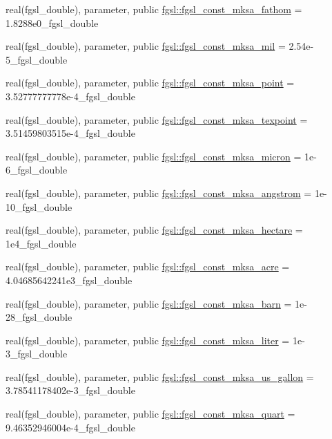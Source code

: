 \begin{DoxyCompactItemize}
real(fgsl\+\_\+double), parameter, public \hyperlink{namespacefgsl_a1b3e809c97882aeaebf2e325079f38a3}{fgsl\+::fgsl\+\_\+const\+\_\+mksa\+\_\+fathom} = 1.\+8288e0\+\_\+fgsl\+\_\+double
\item 
real(fgsl\+\_\+double), parameter, public \hyperlink{namespacefgsl_af6a9d8baf161c3f9b2b9c8ef41833a67}{fgsl\+::fgsl\+\_\+const\+\_\+mksa\+\_\+mil} = 2.\+54e-\/5\+\_\+fgsl\+\_\+double
\item 
real(fgsl\+\_\+double), parameter, public \hyperlink{namespacefgsl_ad8f1c0644b869b25114ce66526bd4a9d}{fgsl\+::fgsl\+\_\+const\+\_\+mksa\+\_\+point} = 3.\+52777777778e-\/4\+\_\+fgsl\+\_\+double
\item 
real(fgsl\+\_\+double), parameter, public \hyperlink{namespacefgsl_a962d8da1f8bc62c2323777660898e316}{fgsl\+::fgsl\+\_\+const\+\_\+mksa\+\_\+texpoint} = 3.\+51459803515e-\/4\+\_\+fgsl\+\_\+double
\item 
real(fgsl\+\_\+double), parameter, public \hyperlink{namespacefgsl_ab0be2229dca10e5128f21a8729ff742b}{fgsl\+::fgsl\+\_\+const\+\_\+mksa\+\_\+micron} = 1e-\/6\+\_\+fgsl\+\_\+double
\item 
real(fgsl\+\_\+double), parameter, public \hyperlink{namespacefgsl_ae348f6545928612e5e56ed4174d31875}{fgsl\+::fgsl\+\_\+const\+\_\+mksa\+\_\+angstrom} = 1e-\/10\+\_\+fgsl\+\_\+double
\item 
real(fgsl\+\_\+double), parameter, public \hyperlink{namespacefgsl_a62efb1288447e01349bbf38c21b82e70}{fgsl\+::fgsl\+\_\+const\+\_\+mksa\+\_\+hectare} = 1e4\+\_\+fgsl\+\_\+double
\item 
real(fgsl\+\_\+double), parameter, public \hyperlink{namespacefgsl_a58e85d8e8be547abd415a03ac8cfe6d9}{fgsl\+::fgsl\+\_\+const\+\_\+mksa\+\_\+acre} = 4.\+04685642241e3\+\_\+fgsl\+\_\+double
\item 
real(fgsl\+\_\+double), parameter, public \hyperlink{namespacefgsl_a859c8ea83a5175d31bc4240282c2b0b4}{fgsl\+::fgsl\+\_\+const\+\_\+mksa\+\_\+barn} = 1e-\/28\+\_\+fgsl\+\_\+double
\item 
real(fgsl\+\_\+double), parameter, public \hyperlink{namespacefgsl_ac989bb9124679e7e571cef06c81e5fe3}{fgsl\+::fgsl\+\_\+const\+\_\+mksa\+\_\+liter} = 1e-\/3\+\_\+fgsl\+\_\+double
\item 
real(fgsl\+\_\+double), parameter, public \hyperlink{namespacefgsl_a9c8e297dc4a0fa63d97e1c130cc5248a}{fgsl\+::fgsl\+\_\+const\+\_\+mksa\+\_\+us\+\_\+gallon} = 3.\+78541178402e-\/3\+\_\+fgsl\+\_\+double
\item 
real(fgsl\+\_\+double), parameter, public \hyperlink{namespacefgsl_a30b92280c9a587dcda6d603b6c737fc3}{fgsl\+::fgsl\+\_\+const\+\_\+mksa\+\_\+quart} = 9.\+46352946004e-\/4\+\_\+fgsl\+\_\+double

\end{DoxyCompactItemize}
